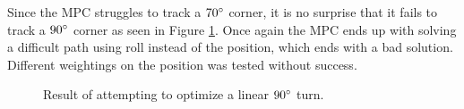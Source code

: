 Since the MPC struggles to track a $70\degree$ corner, it is no surprise that it fails to track a $90\degree$ corner as seen in Figure \ref{fig:turns_lin_90deg}. Once again the MPC ends up with solving a difficult path using roll instead of the position, which ends with a bad solution. Different weightings on the position was tested without success.

\begin{figure}[!h]
	\caption{Result of attempting to optimize a linear $90\degree$ turn.}
	\label{fig:turns_lin_90deg}
\end{figure}